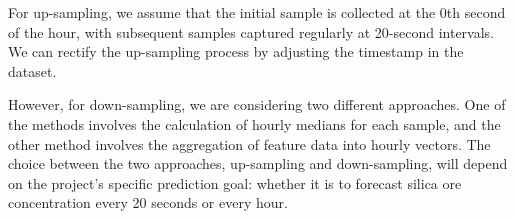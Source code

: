 \documentclass{article}
\begin{document}
For up-sampling, we assume that the initial sample is collected at the 0th second of the hour, with subsequent samples captured regularly at 20-second intervals. We can rectify the up-sampling process by adjusting the timestamp in the dataset.

However, for down-sampling, we are considering two different approaches. One of the methods involves the calculation of hourly medians for each sample, and the other method involves the aggregation of feature data into hourly vectors. The choice between the two approaches, up-sampling and down-sampling, will depend on the project's specific prediction goal: whether it is to forecast silica ore concentration every 20 seconds or every hour.
\end{document}
